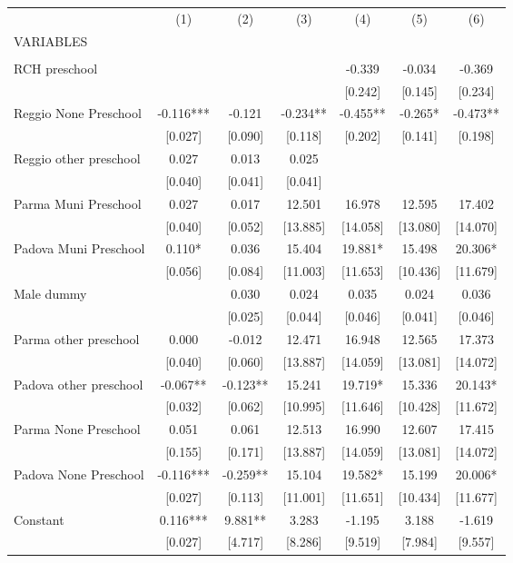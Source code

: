 \begin{tabular}{lcccccc} \hline
 & (1) & (2) & (3) & (4) & (5) & (6) \\
VARIABLES &  &  &  &  &  &  \\ \hline
 &  &  &  &  &  &  \\
RCH preschool &  &  &  & -0.339 & -0.034 & -0.369 \\
 &  &  &  & [0.242] & [0.145] & [0.234] \\
Reggio None Preschool & -0.116*** & -0.121 & -0.234** & -0.455** & -0.265* & -0.473** \\
 & [0.027] & [0.090] & [0.118] & [0.202] & [0.141] & [0.198] \\
Reggio other preschool & 0.027 & 0.013 & 0.025 &  &  &  \\
 & [0.040] & [0.041] & [0.041] &  &  &  \\
Parma Muni Preschool & 0.027 & 0.017 & 12.501 & 16.978 & 12.595 & 17.402 \\
 & [0.040] & [0.052] & [13.885] & [14.058] & [13.080] & [14.070] \\
Padova Muni Preschool & 0.110* & 0.036 & 15.404 & 19.881* & 15.498 & 20.306* \\
 & [0.056] & [0.084] & [11.003] & [11.653] & [10.436] & [11.679] \\
Male dummy &  & 0.030 & 0.024 & 0.035 & 0.024 & 0.036 \\
 &  & [0.025] & [0.044] & [0.046] & [0.041] & [0.046] \\
Parma other preschool & 0.000 & -0.012 & 12.471 & 16.948 & 12.565 & 17.373 \\
 & [0.040] & [0.060] & [13.887] & [14.059] & [13.081] & [14.072] \\
Padova other preschool & -0.067** & -0.123** & 15.241 & 19.719* & 15.336 & 20.143* \\
 & [0.032] & [0.062] & [10.995] & [11.646] & [10.428] & [11.672] \\
Parma None Preschool & 0.051 & 0.061 & 12.513 & 16.990 & 12.607 & 17.415 \\
 & [0.155] & [0.171] & [13.887] & [14.059] & [13.081] & [14.072] \\
Padova None Preschool & -0.116*** & -0.259** & 15.104 & 19.582* & 15.199 & 20.006* \\
 & [0.027] & [0.113] & [11.001] & [11.651] & [10.434] & [11.677] \\
Constant & 0.116*** & 9.881** & 3.283 & -1.195 & 3.188 & -1.619 \\
 & [0.027] & [4.717] & [8.286] & [9.519] & [7.984] & [9.557] \\

\end{tabular}
